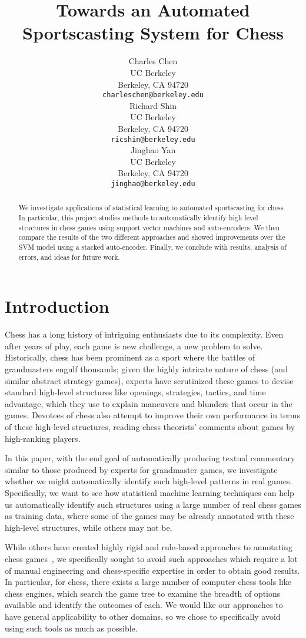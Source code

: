 \documentclass[11pt]{article}
\title{Towards an Automated Sportscasting System for Chess}
\author{
  Charles Chen \\
	UC Berkeley \\
	Berkeley, CA 94720 \\
  {\tt \small{charleschen@berkeley.edu}} \\
\And
  Richard Shin \\
	UC Berkeley \\
	Berkeley, CA 94720 \\
  {\tt \small{ricshin@berkeley.edu}} \\
\And
  Jinghao Yan \\
	UC Berkeley \\
	Berkeley, CA 94720 \\
  {\tt \small{jinghao@berkeley.edu}} \\
}
\begin{document}
\maketitle

\begin{abstract}
We investigate applications of statistical learning to automated sportscasting for chess. In particular, this project studies methods to automatically identify high level structures in chess games using support vector machines and auto-encoders. We then compare the results of the two different approaches and showed improvements over the SVM model using a stacked auto-encoder. Finally, we conclude with results, analysis of errors, and ideas for future work.
\end{abstract}

\section{Introduction}
Chess has a long history of intriguing enthusiasts due to its complexity. Even after years of play, each game is new challenge, a new problem to solve. Historically, chess has been prominent as a sport where the battles of grandmasters engulf thousands; given the highly intricate nature of chess (and similar abstract strategy games), experts have scrutinized these games to devise standard high-level structures like openings, strategies, tactics, and time advantage, which they use to explain maneuvers and blunders that occur in the games. Devotees of chess also attempt to improve their own performance in terms of these high-level structures, reading chess theorists' comments about games by high-ranking players. 

In this paper, with the end goal of automatically producing textual commentary similar to those produced by experts for grandmaster games, we investigate whether we might automatically identify such high-level patterns in real games. Specifically, we want to see how statistical machine learning techniques can help us automatically identify such structures using a large number of real chess games as training data, where some of the games may be already annotated with these high-level structures, while others may not be.

While others have created highly rigid and rule-based approaches to annotating chess games~\cite{cambridge-chess-annotation}, we specifically sought to avoid such approaches which require a lot of manual engineering and chess-specific expertise in order to obtain good results. In particular, for chess, there exists a large number of computer chess tools like chess engines, which search the game tree to examine the breadth of options available and identify the outcomes of each. We would like our approaches to have general applicability to other domains, so we chose to specifically avoid using such tools as much as possible. 
\end{document}
